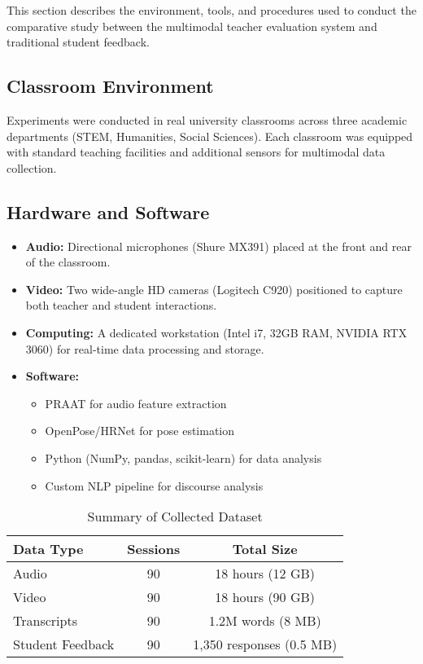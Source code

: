 This section describes the environment, tools, and procedures used to conduct the comparative study between the multimodal teacher evaluation system and traditional student feedback.

\subsection{Classroom Environment}
Experiments were conducted in real university classrooms across three academic departments (STEM, Humanities, Social Sciences). Each classroom was equipped with standard teaching facilities and additional sensors for multimodal data collection.

\subsection{Hardware and Software}
\begin{itemize}
    \item \textbf{Audio:} Directional microphones (Shure MX391) placed at the front and rear of the classroom.
    \item \textbf{Video:} Two wide-angle HD cameras (Logitech C920) positioned to capture both teacher and student interactions.
    \item \textbf{Computing:} A dedicated workstation (Intel i7, 32GB RAM, NVIDIA RTX 3060) for real-time data processing and storage.
    \item \textbf{Software:} 
        \begin{itemize}
            \item PRAAT for audio feature extraction
            \item OpenPose/HRNet for pose estimation
            \item Python (NumPy, pandas, scikit-learn) for data analysis
            \item Custom NLP pipeline for discourse analysis
        \end{itemize}
\end{itemize}

\begin{table}[H]
    \centering
    \normalsize
    \caption{Summary of Collected Dataset}
    \label{tab:dataset_summary}
    \begin{tabular}{lcc}
        \toprule
        \textbf{Data Type} & \textbf{Sessions} & \textbf{Total Size} \\
        \midrule
        Audio & 90 & 18 hours (12 GB) \\
        Video & 90 & 18 hours (90 GB) \\
        Transcripts & 90 & 1.2M words (8 MB) \\
        Student Feedback & 90 & 1,350 responses (0.5 MB) \\
        \bottomrule
    \end{tabular}
\end{table}


